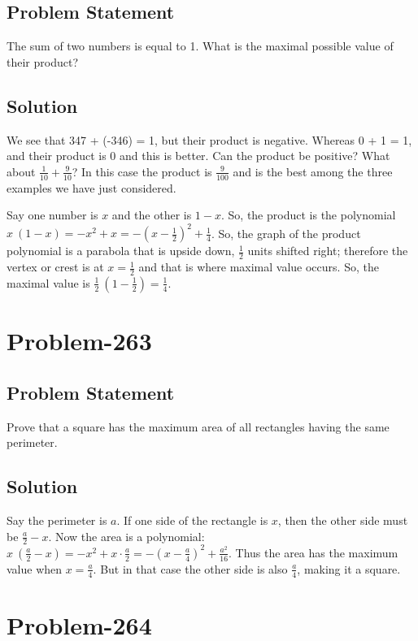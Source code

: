 \documentclass[12pt]{article}
\begin{document}
\subsection*{Problem Statement}
The sum of two numbers is equal to 1. What is the maximal possible value of their product?

\subsection*{Solution}
We see that 347 + (-346) = 1, but their product is negative. Whereas 0 + 1 = 1, and their product is 0 and this is better. Can the product be positive? What about $\frac{1}{10} + \frac{9}{10}$? In this case the product is $\frac{9}{100}$ and is the best among the three examples we have just considered.

Say one number is $x$ and the other is $1-x$. So, the product is the polynomial $x\ (1-x) = -x^2+x = -\left( x - \frac{1}{2} \right)^2 + \frac{1}{4}$. So, the graph of the product polynomial is a parabola that is upside down, $\frac{1}{2}$ units shifted right; therefore the vertex or crest is at $x = \frac{1}{2}$ and that is where maximal value occurs. So, the maximal value is $\frac{1}{2}\ \left( 1 - \frac{1}{2} \right) = \frac{1}{4}$.

\section*{Problem-263}
\subsection*{Problem Statement}
Prove that a square has the maximum area of all rectangles having the same perimeter.

\subsection*{Solution}
Say the perimeter is $a$. If one side of the rectangle is $x$, then the other side must be $\frac{a}{2} - x$. Now the area is a polynomial:  $x\ \left( \frac{a}{2}-x \right) = -x^2 + x\cdot \frac{a}{2} = -\left( x - \frac{a}{4} \right)^2 + \frac{a^2}{16}$. Thus the area has the maximum value when $x = \frac{a}{4}$. But in that case the other side is also $\frac{a}{4}$, making it a square.

\section*{Problem-264}
\end{document}
